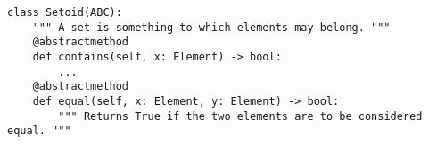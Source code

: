 \par\begin{minipage}{76ex}
\begin{verbatim}
class Setoid(ABC):
    """ A set is something to which elements may belong. """
    @abstractmethod
    def contains(self, x: Element) -> bool:
        ...
    @abstractmethod
    def equal(self, x: Element, y: Element) -> bool:
        """ Returns True if the two elements are to be considered equal. """
\end{verbatim}
\end{minipage}\par